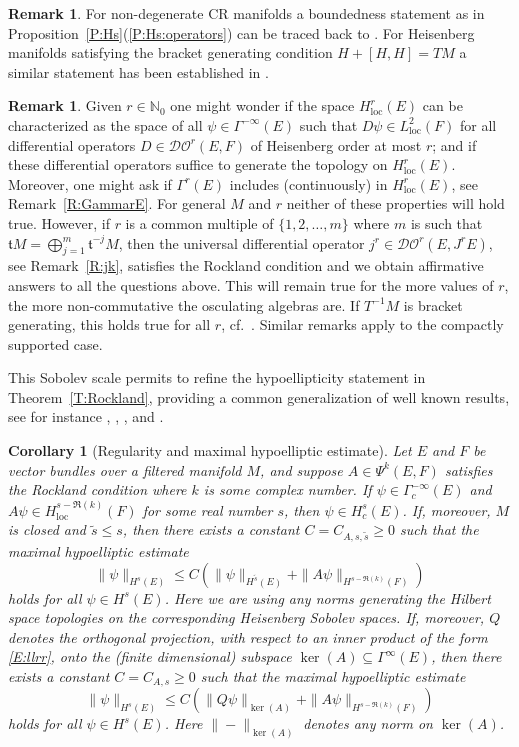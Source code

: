 \documentclass[reqno,12pt]{amsart}
\newcommand{\DO}{\mathcal D\mathcal O}
\newcommand\N{\mathbb N}
\newcommand\loc{\textrm{loc}}
\newcommand\itemref[1]{(\ref{#1})}
\theoremstyle{plain}
\newtheorem{corollary}[theorem]{Corollary}
\theoremstyle{definition}
\newtheorem{remark}[theorem]{Remark}
\begin{document}
\begin{remark}
For non-degenerate CR manifolds a boundedness statement as in Proposition~\ref{P:Hs}\itemref{P:Hs:operators} can be traced back to \cite[Theorem~15.19]{FS74}.
For Heisenberg manifolds satisfying the bracket generating condition $H+[H,H]=TM$ a similar statement has been established in \cite[Proposition~5.5.8]{P08}.
\end{remark}


\begin{remark}\label{R:CrHr}
Given $r\in\N_0$ one might wonder if the space $H^r_\loc(E)$ can be characterized as the space of all $\psi\in\Gamma^{-\infty}(E)$ such that $D\psi\in L^2_\loc(F)$ for all differential operators $D\in\DO^r(E,F)$ of Heisenberg order at most $r$; and if these differential operators suffice to generate the topology on $H^r_\loc(E)$.
Moreover, one might ask if $\Gamma^r(E)$ includes (continuously) in $H^r_\loc(E)$, see Remark~\ref{R:GammarE}.
For general $M$ and $r$ neither of these properties will hold true.
However, if $r$ is a common multiple of $\{1,2,\dotsc,m\}$ where $m$ is such that $\mathfrak tM=\bigoplus_{j=1}^m\mathfrak t^{-j}M$, then the universal differential operator $j^r\in\DO^r(E,J^rE)$, see Remark~\ref{R:jk}, satisfies the Rockland condition and we obtain affirmative answers to all the questions above.
This will remain true for the more values of $r$, the more non-commutative the osculating algebras are.
If $T^{-1}M$ is bracket generating, this holds true for all $r$, cf.\ \cite{FS74,BG88,P08}.
Similar remarks apply to the compactly supported case. 
\end{remark}


This Sobolev scale permits to refine the hypoellipticity statement in Theorem~\ref{T:Rockland}, providing a common generalization of well known results, see for instance \cite[Propositions~5.5.9 and 5.5.14]{P08},
\cite[Theorem~16.6]{FS74}, \cite{HN85}, and \cite[Theorem~18.31]{BG88}.


\begin{corollary}[Regularity and maximal hypoelliptic estimate]\label{C:reg}
Let $E$ and $F$ be vector bundles over a filtered manifold $M$, and suppose $A\in\Psi^k(E,F)$ satisfies the Rockland condition where $k$ is some complex number.
If $\psi\in\Gamma^{-\infty}_c(E)$ and $A\psi\in H_\loc^{s-\Re(k)}(F)$ for some real number $s$, then $\psi\in H^s_c(E)$.
If, moreover, $M$ is closed and $\tilde s\leq s$, then there exists a constant $C=C_{A,s,\tilde s}\geq0$ such that the maximal hypoelliptic estimate
$$
\|\psi\|_{H^s(E)}\leq C\left(\|\psi\|_{H^{\tilde s}(E)}+\|A\psi\|_{H^{s-\Re(k)}(F)}\right)
$$
holds for all $\psi\in H^s(E)$.
Here we are using any norms generating the Hilbert space topologies on the corresponding Heisenberg Sobolev spaces.
If, moreover, $Q$ denotes the orthogonal projection, with respect to an inner product of the form \eqref{E:llrr}, onto the (finite dimensional) subspace $\ker(A)\subseteq\Gamma^\infty(E)$, then there exists a constant $C=C_{A,s}\geq0$ such that the maximal hypoelliptic estimate
$$
\|\psi\|_{H^s(E)}\leq C\left(\|Q\psi\|_{\ker(A)}+\|A\psi\|_{H^{s-\Re(k)}(F)}\right)
$$
holds for all $\psi\in H^s(E)$. Here $\|-\|_{\ker(A)}$ denotes any norm on $\ker(A)$.
\end{corollary}
\end{document}
